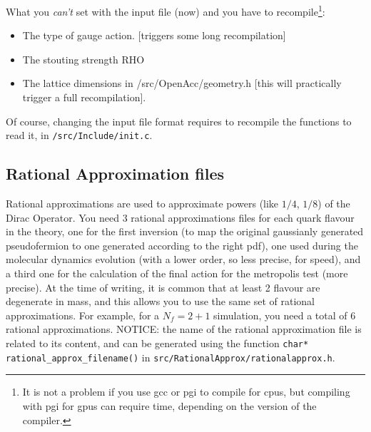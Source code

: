 \documentclass[a4paper,10pt]{book}
\begin{document}
  What you \emph{can't} set with the input file (now) and you have to
  recompile\footnote{ It is not a problem if you use gcc or pgi to compile for 
cpus, but compiling with pgi for gpus can require time, depending on the
   version of the compiler.}:
   \begin{itemize}
    \item The type of gauge action. [triggers some long recompilation]
  \item The stouting strength RHO 
  \item The lattice dimensions in /src/OpenAcc/geometry.h [this will
    practically trigger a full recompilation].
   \end{itemize}
  Of course, changing the input file format requires to recompile the functions 
to read it, in \verb|/src/Include/init.c|.

\subsection{ Rational Approximation files}
  Rational approximations are used to approximate powers (like $1/4$,
  $1/8$) of the Dirac Operator.
  You need $3$ rational approximations files for each quark flavour in the
  theory, one for the first inversion (to map the original
  gaussianly generated pseudofermion to one generated according to the
  right pdf), one used during the molecular dynamics evolution (with a
  lower order, so less precise, for speed), and a third one for the
  calculation of the final action for the metropolis test (more
  precise). At the time of writing, it is common that at least 2 flavour are 
  degenerate in mass, and this allows you to use the same set of rational
  approximations. For example, for a $N_f=2+1$ simulation, you need a total
  of 6 rational approximations.
  NOTICE: the name of the rational approximation file is related to
  its content, and can be generated using the function
  \verb|char* rational_approx_filename()| in
  \verb|src/RationalApprox/rationalapprox.h|.
\end{document}
